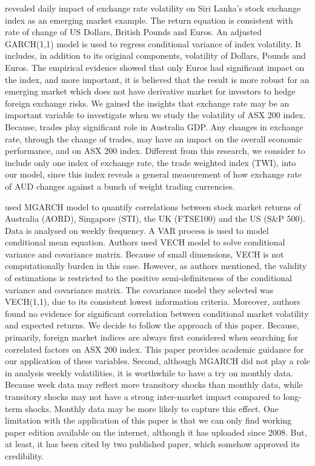 \documentclass[11pt]{article}
\begin{document}
\cite{exr} revealed daily impact of exchange rate volatility on Siri Lanka’s stock exchange index as an emerging market example. The return equation is consistent with rate of change of US Dollars, British Pounds and Euros. An adjusted GARCH(1,1) model is used to regress conditional variance of index volatility. It includes, in addition to its original components, volatility of Dollars, Pounds and Euros. The empirical evidence showed that only Euros had significant impact on the index, and more important, it is believed that the result is more robust for an emerging market which does not have derivative market for investors to hedge foreign exchange risks. We gained the insights that exchange rate may be an important variable to investigate when we study the volatility of ASX 200 index. Because, trades play significant role in Australia GDP. Any changes in exchange rate, through the change of trades, may have an impact on the overall economic performance, and on ASX 200 index. Different from this research, we consider to include only one index of exchange rate, the trade weighted index (TWI), into our model, since this index reveals a general measurement of how exchange rate of AUD changes against a bunch of weight trading currencies. 

\cite{index} used MGARCH model to quantify correlations between stock market returns of Australia (AORD), Singapore (STI), the UK (FTSE100) and the US (S\&P 500). Data is analysed on weekly frequency. A VAR process is used to model conditional mean equation. Authors used VECH model to solve conditional variance and covariance matrix. Because of small dimensions, VECH is not computationally burden in this case. However, as authors mentioned, the validity of estimations is restricted to the positive semi-definiteness of the conditional variance and covariance matrix. The covariance model they selected was VECH(1,1), due to its consistent lowest information criteria. Moreover, authors found no evidence for significant correlation between conditional market volatility and expected returns. We decide to follow the approach of this paper. Because, primarily, foreign market indices are always first considered when searching for correlated factors on ASX 200 index. This paper provides academic guidance for our application of these variables. Second, although MGARCH did not play a role in analysis weekly volatilities, it is worthwhile to have a try on monthly data. Because week data may reflect more transitory shocks than monthly data, while transitory shocks may not have a strong inter-market impact compared to long-term shocks. Monthly data may be more likely to capture this effect. One limitation with the application of this paper is that we can only find working paper edition available on the internet, although it has uploaded since 2008. But, at least, it has been cited by two published paper, which somehow approved its credibility. 
\end{document}
